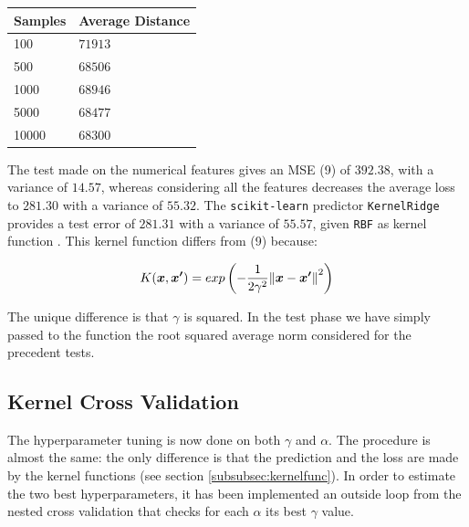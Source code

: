 \documentclass{article}
\begin{document}
\begin{table}[H]
	\label{sampletable}
	\centering
	\begin{tabular}{|l|l|}
		\hline
		Samples & Average Distance   \\ \hline
		100     & $71913$ \\ \hline
		500     & $68506$ \\ \hline
		1000    & $68946$  \\ \hline
		5000    & $68477$ \\ \hline
		10000   & $68300$  \\ \hline
	\end{tabular}
\end{table}

The test made on the numerical features gives an MSE (9) of $392.38$, with a variance of $14.57$, whereas considering all the features decreases the average loss to $281.30$ with a variance of $55.32$. The \texttt{scikit-learn} predictor \texttt{KernelRidge} provides a test error of $281.31$ with a variance of $55.57$, given \texttt{RBF} as kernel function \cite{rbf}. This kernel function differs from (9) because:

\begin{equation}
    K(\boldsymbol{x},\boldsymbol{x^\prime}) = exp \left(-\frac{1}{2\gamma^2}\norm{\boldsymbol{x}-\boldsymbol{x^\prime}}^2 \right)\hfill
\end{equation}
       
The unique difference is that $\gamma$ is squared. In the test phase we have simply passed to the function the root squared average norm considered for the precedent tests.

\subsection{Kernel Cross Validation}
The hyperparameter tuning is now done on both $\gamma$ and $\alpha$. The procedure is almost the same: the only difference is that the prediction and the loss are made by the kernel functions (see section \ref{subsubsec:kernelfunc}). In order to estimate the two best hyperparameters, it has been implemented an outside loop from the nested cross validation that checks for each $\alpha$ its best $\gamma$ value. 
\end{document}

